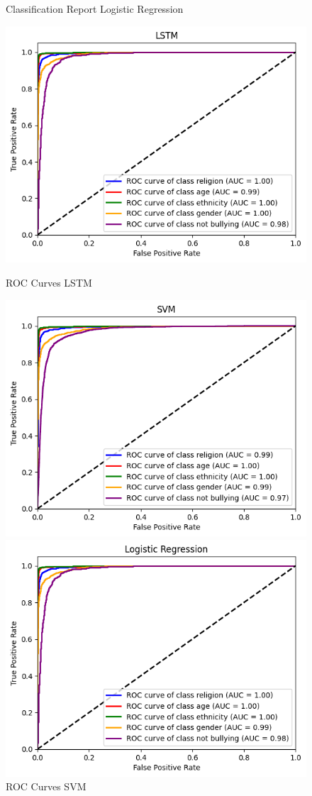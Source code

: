 \documentclass[conference]{IEEEtran}
\begin{document}
\begin{figure}[!htb]
{\caption{Classification Report Logistic Regression}
\label{fig:cmp3}}
\parbox{0.65\columnwidth}{
\includegraphics[scale=0.37]{CLSTM.png}
\caption{ROC Curves LSTM}
\label{fig:cmp4}}
\parbox{0.65\columnwidth}{
\includegraphics[scale=0.37]{CSVM.png}
\caption{ROC Curves SVM}
\label{fig:cmp5}}
\parbox{0.65\columnwidth}{
\includegraphics[scale=0.37]{CLR.png}
}
\end{figure}
\end{document}
